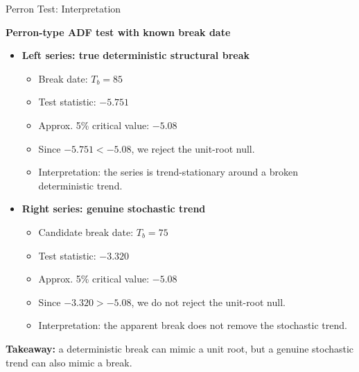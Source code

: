 \documentclass{beamer}
\begin{document}
\begin{frame}{Perron Test: Interpretation}

\textbf{Perron-type ADF test with known break date}

\medskip

\begin{itemize}
  \item \textbf{Left series: true deterministic structural break}
  \begin{itemize}
    \item Break date: $T_b = 85$
    \item Test statistic: $-5.751$
    \item Approx. 5\% critical value: $-5.08$
    \item Since $-5.751 < -5.08$, we reject the unit-root null.
    \item Interpretation: the series is trend-stationary around a broken deterministic trend.
  \end{itemize}

  \medskip

  \item \textbf{Right series: genuine stochastic trend}
  \begin{itemize}
    \item Candidate break date: $T_b = 75$
    \item Test statistic: $-3.320$
    \item Approx. 5\% critical value: $-5.08$
    \item Since $-3.320 > -5.08$, we do not reject the unit-root null.
    \item Interpretation: the apparent break does not remove the stochastic trend.
  \end{itemize}
\end{itemize}

\medskip

\textbf{Takeaway:} a deterministic break can mimic a unit root, but a genuine stochastic trend can also mimic a break.

\end{frame}
\end{document}
